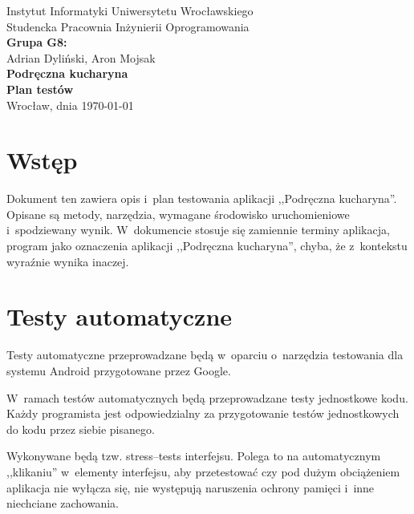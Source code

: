\documentclass[a4paper,11pt,titlepage,twoside]{mwart}
\begin{document}
\begin{titlepage}
\begin{center}
\large{Instytut Informatyki Uniwersytetu Wrocławskiego\\Studencka Pracownia Inżynierii Oprogramowania}\\[3.0cm]
\Large {\bfseries Grupa G8:}\\
\large Adrian Dyliński, Aron Mojsak\\[4.0cm]
{ \Huge \bfseries Podręczna kucharyna}\\[0.5cm]
{ \large \bfseries Plan testów}\\
\vfill
{\large Wrocław, dnia \today}
\end{center}
\end{titlepage}
\mbox{}
\thispagestyle{empty}
\newpage
\setcounter{page}{1}
\tableofcontents
\newpage
\section{Wstęp}
Dokument ten zawiera opis i~plan testowania aplikacji ,,Podręczna kucharyna''. Opisane są metody, narzędzia, wymagane środowisko uruchomieniowe i~spodziewany wynik. W~dokumencie stosuje się zamiennie terminy aplikacja, program jako oznaczenia aplikacji ,,Podręczna kucharyna'', chyba, że z~kontekstu wyraźnie wynika inaczej.
\section{Testy automatyczne}
Testy automatyczne przeprowadzane będą w~oparciu o~narzędzia testowania dla systemu Android przygotowane przez Google. 

W~ramach testów automatycznych będą przeprowadzane testy jednostkowe kodu. Każdy programista jest odpowiedzialny za przygotowanie testów jednostkowych do kodu przez siebie pisanego.

Wykonywane będą tzw. stress--tests interfejsu. Polega to na automatycznym ,,klikaniu'' w~elementy interfejsu, aby przetestować czy pod dużym obciążeniem aplikacja nie wyłącza się, nie występują naruszenia ochrony pamięci i~inne niechciane zachowania.
\end{document}

